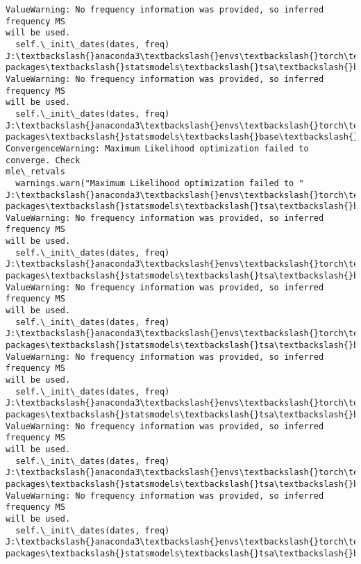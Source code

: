 \documentclass[11pt]{article}
\begin{document}
\begin{Verbatim}[commandchars=\\\{\}]
ValueWarning: No frequency information was provided, so inferred frequency MS
will be used.
  self.\_init\_dates(dates, freq)
J:\textbackslash{}anaconda3\textbackslash{}envs\textbackslash{}torch\textbackslash{}Lib\textbackslash{}site-packages\textbackslash{}statsmodels\textbackslash{}tsa\textbackslash{}base\textbackslash{}tsa\_model.py:473:
ValueWarning: No frequency information was provided, so inferred frequency MS
will be used.
  self.\_init\_dates(dates, freq)
J:\textbackslash{}anaconda3\textbackslash{}envs\textbackslash{}torch\textbackslash{}Lib\textbackslash{}site-packages\textbackslash{}statsmodels\textbackslash{}base\textbackslash{}model.py:607:
ConvergenceWarning: Maximum Likelihood optimization failed to converge. Check
mle\_retvals
  warnings.warn("Maximum Likelihood optimization failed to "
J:\textbackslash{}anaconda3\textbackslash{}envs\textbackslash{}torch\textbackslash{}Lib\textbackslash{}site-packages\textbackslash{}statsmodels\textbackslash{}tsa\textbackslash{}base\textbackslash{}tsa\_model.py:473:
ValueWarning: No frequency information was provided, so inferred frequency MS
will be used.
  self.\_init\_dates(dates, freq)
J:\textbackslash{}anaconda3\textbackslash{}envs\textbackslash{}torch\textbackslash{}Lib\textbackslash{}site-packages\textbackslash{}statsmodels\textbackslash{}tsa\textbackslash{}base\textbackslash{}tsa\_model.py:473:
ValueWarning: No frequency information was provided, so inferred frequency MS
will be used.
  self.\_init\_dates(dates, freq)
J:\textbackslash{}anaconda3\textbackslash{}envs\textbackslash{}torch\textbackslash{}Lib\textbackslash{}site-packages\textbackslash{}statsmodels\textbackslash{}tsa\textbackslash{}base\textbackslash{}tsa\_model.py:473:
ValueWarning: No frequency information was provided, so inferred frequency MS
will be used.
  self.\_init\_dates(dates, freq)
J:\textbackslash{}anaconda3\textbackslash{}envs\textbackslash{}torch\textbackslash{}Lib\textbackslash{}site-packages\textbackslash{}statsmodels\textbackslash{}tsa\textbackslash{}base\textbackslash{}tsa\_model.py:473:
ValueWarning: No frequency information was provided, so inferred frequency MS
will be used.
  self.\_init\_dates(dates, freq)
J:\textbackslash{}anaconda3\textbackslash{}envs\textbackslash{}torch\textbackslash{}Lib\textbackslash{}site-packages\textbackslash{}statsmodels\textbackslash{}tsa\textbackslash{}base\textbackslash{}tsa\_model.py:473:
ValueWarning: No frequency information was provided, so inferred frequency MS
will be used.
  self.\_init\_dates(dates, freq)
J:\textbackslash{}anaconda3\textbackslash{}envs\textbackslash{}torch\textbackslash{}Lib\textbackslash{}site-packages\textbackslash{}statsmodels\textbackslash{}tsa\textbackslash{}base\textbackslash{}tsa\_model.py:473:

\end{Verbatim}
\end{document}
